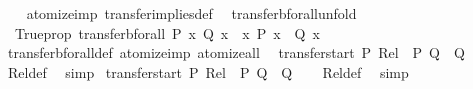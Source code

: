 \begin{isabellebody}
%
\isadelimproof
\ \ %
\endisadelimproof
%
\isatagproof
{}\isamarkupfalse%
\ atomize{\isacharunderscore}{\kern0pt}imp\ transfer{\isacharunderscore}{\kern0pt}implies{\isacharunderscore}{\kern0pt}def\ \isacommand{{\isachardot}{\kern0pt}{\isachardot}{\kern0pt}}\isamarkupfalse%
%
\endisatagproof
{\isafoldproof}%
%
\isadelimproof
\isanewline
%
\endisadelimproof
\isanewline
{}\isamarkupfalse%
\ transfer{\isacharunderscore}{\kern0pt}bforall{\isacharunderscore}{\kern0pt}unfold{\isacharcolon}{\kern0pt}\isanewline
\ \ {\isachardoublequoteopen}Trueprop\ {\isacharparenleft}{\kern0pt}transfer{\isacharunderscore}{\kern0pt}bforall\ P\ {\isacharparenleft}{\kern0pt}{\isasymlambda}x{\isachardot}{\kern0pt}\ Q\ x{\isacharparenright}{\kern0pt}{\isacharparenright}{\kern0pt}\ {\isasymequiv}\ {\isacharparenleft}{\kern0pt}{\isasymAnd}x{\isachardot}{\kern0pt}\ P\ x\ {\isasymLongrightarrow}\ Q\ x{\isacharparenright}{\kern0pt}{\isachardoublequoteclose}\isanewline
%
\isadelimproof
\ \ %
\endisadelimproof
%
\isatagproof
{}\isamarkupfalse%
\ transfer{\isacharunderscore}{\kern0pt}bforall{\isacharunderscore}{\kern0pt}def\ atomize{\isacharunderscore}{\kern0pt}imp\ atomize{\isacharunderscore}{\kern0pt}all\ \isacommand{{\isachardot}{\kern0pt}{\isachardot}{\kern0pt}}\isamarkupfalse%
%
\endisatagproof
{\isafoldproof}%
%
\isadelimproof
\isanewline
%
\endisadelimproof
\isanewline
{}\isamarkupfalse%
\ transfer{\isacharunderscore}{\kern0pt}start{\isacharcolon}{\kern0pt}\ {\isachardoublequoteopen}{\isasymlbrakk}P{\isacharsemicolon}{\kern0pt}\ Rel\ {\isacharparenleft}{\kern0pt}{\isacharequal}{\kern0pt}{\isacharparenright}{\kern0pt}\ P\ Q{\isasymrbrakk}\ {\isasymLongrightarrow}\ Q{\isachardoublequoteclose}\isanewline
%
\isadelimproof
\ \ %
\endisadelimproof
%
\isatagproof
{}\isamarkupfalse%
\ Rel{\isacharunderscore}{\kern0pt}def\ \isamarkupfalse%
\ simp%
\endisatagproof
{\isafoldproof}%
%
\isadelimproof
\isanewline
%
\endisadelimproof
\isanewline
{}\isamarkupfalse%
\ transfer{\isacharunderscore}{\kern0pt}start{\isacharprime}{\kern0pt}{\isacharcolon}{\kern0pt}\ {\isachardoublequoteopen}{\isasymlbrakk}P{\isacharsemicolon}{\kern0pt}\ Rel\ {\isacharparenleft}{\kern0pt}{\isasymlongrightarrow}{\isacharparenright}{\kern0pt}\ P\ Q{\isasymrbrakk}\ {\isasymLongrightarrow}\ Q{\isachardoublequoteclose}\isanewline
%
\isadelimproof
\ \ %
\endisadelimproof
%
\isatagproof
{}\isamarkupfalse%
\ Rel{\isacharunderscore}{\kern0pt}def\ \isamarkupfalse%
\ simp%
\endisatagproof

\end{isabellebody}

